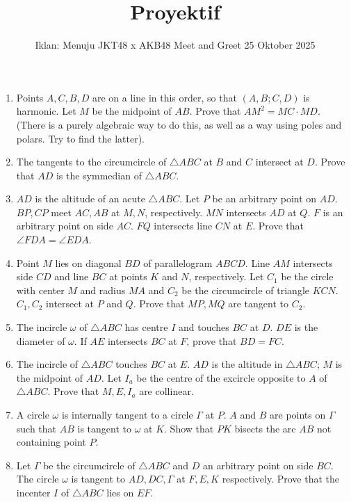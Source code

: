 \documentclass[12pt]{scrartcl}
\title{Proyektif}
\date{Iklan: Menuju JKT48 x AKB48 Meet and Greet 25 Oktober 2025}
\begin{document}
\begin{enumerate}
    \item Points $A, C, B, D$ are on a line in this order, so that $(A,B;C,D)$ is harmonic. Let $M$ be the midpoint of $AB$. Prove that $AM^2 = MC \cdot MD$. (There is a purely algebraic way to do this, as well as a way using poles and polars. Try to find the latter).

    \item The tangents to the circumcircle of $\triangle ABC$ at $B$ and $C$ intersect at $D$. Prove that $AD$ is the symmedian of $\triangle ABC$.

    \item $AD$ is the altitude of an acute $\triangle ABC$. Let $P$ be an arbitrary point on $AD$. $BP, CP$ meet $AC, AB$ at $M, N$, respectively. $MN$ intersects $AD$ at $Q$. $F$ is an arbitrary point on side $AC$. $FQ$ intersects line $CN$ at $E$. Prove that $\angle FDA = \angle EDA$.

    \item Point $M$ lies on diagonal $BD$ of parallelogram $ABCD$. Line $AM$ intersects side $CD$ and line $BC$ at points $K$ and $N$, respectively. Let $C_1$ be the circle with center $M$ and radius $MA$ and $C_2$ be the circumcircle of triangle $KCN$. $C_1, C_2$ intersect at $P$ and $Q$. Prove that $MP, MQ$ are tangent to $C_2$.
    
    \item The incircle $\omega$ of $\triangle ABC$ has centre $I$ and touches $BC$ at $D$. $DE$ is the diameter of $\omega$. If $AE$ intersects $BC$ at $F$, prove that $BD=FC$.

    \item The incircle of $\triangle ABC$ touches $BC$ at $E$. $AD$ is the altitude in $\triangle ABC$; $M$ is the midpoint of $AD$. Let $I_a$ be the centre of the excircle opposite to $A$ of $\triangle ABC$. Prove that $M, E, I_a$ are collinear.

    \item A circle $\omega$ is internally tangent to a circle $\Gamma$ at $P$. $A$ and $B$ are points on $\Gamma$ such that $AB$ is tangent to $\omega$ at $K$. Show that $PK$ bisects the arc $AB$ not containing point $P$.

    \item Let $\Gamma$ be the circumcircle of $\triangle ABC$ and $D$ an arbitrary point on side $BC$. The circle $\omega$ is tangent to $AD, DC, \Gamma$ at $F, E, K$ respectively. Prove that the incenter $I$ of $\triangle ABC$ lies on $EF$.


\end{enumerate}
\end{document}

